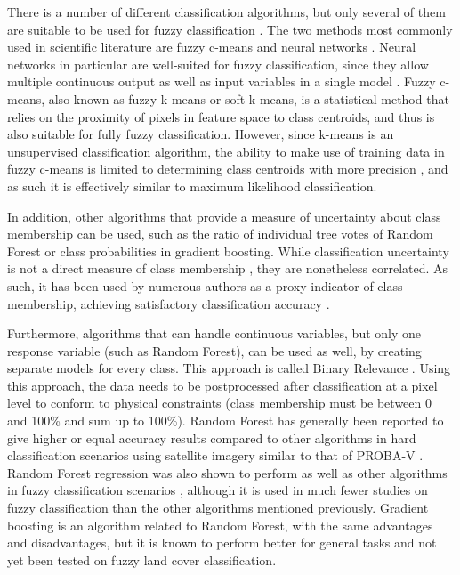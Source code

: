 \documentclass[a4paper,10pt]{article}
\begin{document}
There is a number of different classification algorithms, but only several of them are suitable to be used for fuzzy classification \cite{nath2014methods}. The two methods most commonly used in scientific literature are fuzzy c-means and neural networks \cite{zhang2001fullyfuzzy}. Neural networks in particular are well-suited for fuzzy classification, since they allow multiple continuous output as well as input variables in a single model \cite{foody1997fuzzynnet}. Fuzzy c-means, also known as fuzzy k-means or soft k-means, is a statistical method that relies on the proximity of pixels in feature space to class centroids, and thus is also suitable for fully fuzzy classification. However, since k-means is an unsupervised classification algorithm, the ability to make use of training data in fuzzy c-means is limited to determining class centroids with more precision \cite{hengl2004fuzzycmeans}, and as such it is effectively similar to maximum likelihood classification.

In addition, other algorithms that provide a measure of uncertainty about class membership can be used, such as the ratio of individual tree votes of Random Forest or class probabilities in gradient boosting. While classification uncertainty is not a direct measure of class membership \cite{sytze2000fuzzyset}, they are nonetheless correlated. As such, it has been used by numerous authors as a proxy indicator of class membership, achieving satisfactory classification accuracy \cite{foody2002accuracy}.

Furthermore, algorithms that can handle continuous variables, but only one response variable (such as Random Forest), can be used as well, by creating separate models for every class. This approach is called Binary Relevance \cite{karalas2016br}. Using this approach, the data needs to be postprocessed after classification at a pixel level to conform to physical constraints (class membership must be between 0 and 100\% and sum up to 100\%). Random Forest has generally been reported to give higher or equal accuracy results compared to other algorithms in hard classification scenarios using satellite imagery similar to that of PROBA-V \cite{duro2012algorithmcomparison}. Random Forest regression was also shown to perform as well as other algorithms in fuzzy classification scenarios \cite{walton2008subpixelrf}, although it is used in much fewer studies on fuzzy classification than the other algorithms mentioned previously. Gradient boosting is an algorithm related to Random Forest, with the same advantages and disadvantages, but it is known to perform better for general tasks and not yet been tested on fuzzy land cover classification.
\end{document}
